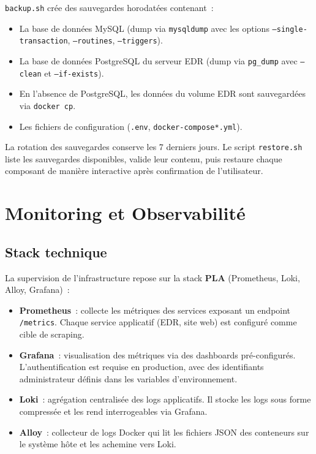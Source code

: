 \texttt{backup.sh} crée des sauvegardes horodatées contenant~:

\begin{itemize}
  \item La base de données MySQL (dump via \texttt{mysqldump} avec les options
    \texttt{--single-transaction}, \texttt{--routines}, \texttt{--triggers}).
  \item La base de données PostgreSQL du serveur EDR (dump via \texttt{pg\_dump}
    avec \texttt{--clean} et \texttt{--if-exists}).
  \item En l'absence de PostgreSQL, les données du volume EDR sont sauvegardées
    via \texttt{docker cp}.
  \item Les fichiers de configuration (\texttt{.env}, \texttt{docker-compose*.yml}).
\end{itemize}

La rotation des sauvegardes conserve les 7 derniers jours. Le script
\texttt{restore.sh} liste les sauvegardes disponibles, valide leur contenu,
puis restaure chaque composant de manière interactive après confirmation de
l'utilisateur.

\section{Monitoring et Observabilité}

\subsection{Stack technique}

La supervision de l'infrastructure repose sur la stack \textbf{PLA}
(Prometheus, Loki, Alloy, Grafana)~:

\begin{itemize}
  \item \textbf{Prometheus}~: collecte les métriques des services exposant un
    endpoint \texttt{/metrics}. Chaque service applicatif (EDR, site web) est
    configuré comme cible de scraping.
  \item \textbf{Grafana}~: visualisation des métriques via des dashboards
    pré-configurés. L'authentification est requise en production, avec des
    identifiants administrateur définis dans les variables d'environnement.
  \item \textbf{Loki}~: agrégation centralisée des logs applicatifs. Il stocke
    les logs sous forme compressée et les rend interrogeables via Grafana.
  \item \textbf{Alloy}~: collecteur de logs Docker qui lit les fichiers JSON
    des conteneurs sur le système hôte et les achemine vers Loki.
\end{itemize}

